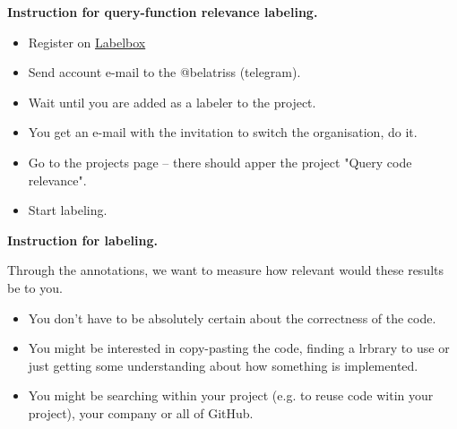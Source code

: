 \documentclass[12 pt]{article}
\begin{document}
{\bf \Large Instruction for query-function relevance labeling. } 
\begin{itemize}
	\item Register on \href{https://labelbox.com}{Labelbox}
	\item Send account e-mail to the @belatriss (telegram). 
	\item Wait until you are added as a labeler to the project.
	\item You get an e-mail with the invitation to switch the organisation, do it.
	\item Go to the projects page -- there should apper the project "Query code relevance".
	\item Start labeling.
\end{itemize}

{\bf \Large Instruction for labeling. } 

Through the annotations, we want to measure how relevant would these results be to you. 
\begin{itemize}
	\item You don't have to be absolutely certain about the correctness of the code.
	\item You might be interested in copy-pasting the code, finding a lrbrary to use or just getting some understanding about how something is implemented.
	\item You might be searching within your project (e.g. to reuse code witin your project), your company or all of GitHub.
\end{itemize}
\end{document}
